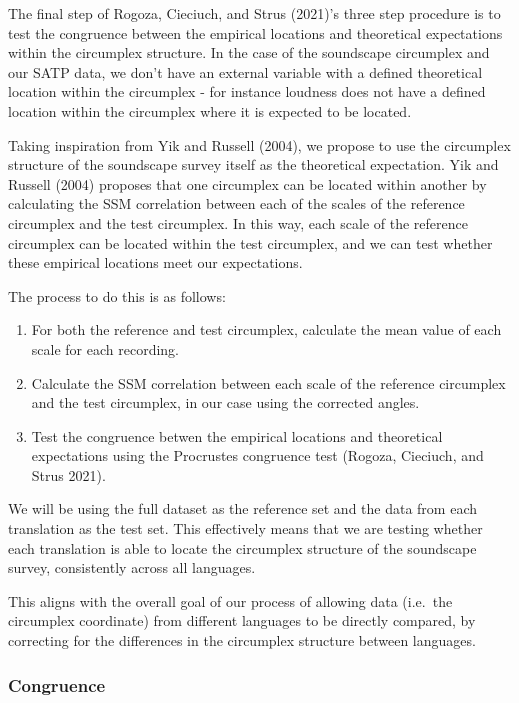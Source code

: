 \documentclass[
  default,
]{sn-jnl}
\providecommand{\tightlist}{%
  \setlength{\itemsep}{0pt}\setlength{\parskip}{0pt}}
\begin{document}
The final step of Rogoza, Cieciuch, and Strus (2021)'s three step
procedure is to test the congruence between the empirical locations and
theoretical expectations within the circumplex structure. In the case of
the soundscape circumplex and our SATP data, we don't have an external
variable with a defined theoretical location within the circumplex - for
instance loudness does not have a defined location within the circumplex
where it is expected to be located.

Taking inspiration from Yik and Russell (2004), we propose to use the
circumplex structure of the soundscape survey itself as the theoretical
expectation. Yik and Russell (2004) proposes that one circumplex can be
located within another by calculating the SSM correlation between each
of the scales of the reference circumplex and the test circumplex. In
this way, each scale of the reference circumplex can be located within
the test circumplex, and we can test whether these empirical locations
meet our expectations.

The process to do this is as follows:

\begin{enumerate}
\def\labelenumi{\arabic{enumi}.}
\tightlist
\item
  For both the reference and test circumplex, calculate the mean value
  of each scale for each recording.
\item
  Calculate the SSM correlation between each scale of the reference
  circumplex and the test circumplex, in our case using the corrected
  angles.
\item
  Test the congruence betwen the empirical locations and theoretical
  expectations using the Procrustes congruence test (Rogoza, Cieciuch,
  and Strus 2021).
\end{enumerate}

We will be using the full dataset as the reference set and the data from
each translation as the test set. This effectively means that we are
testing whether each translation is able to locate the circumplex
structure of the soundscape survey, consistently across all languages.

This aligns with the overall goal of our process of allowing data
(i.e.~the circumplex coordinate) from different languages to be directly
compared, by correcting for the differences in the circumplex structure
between languages.

\subsubsection{Congruence}\label{congruence}
\end{document}
